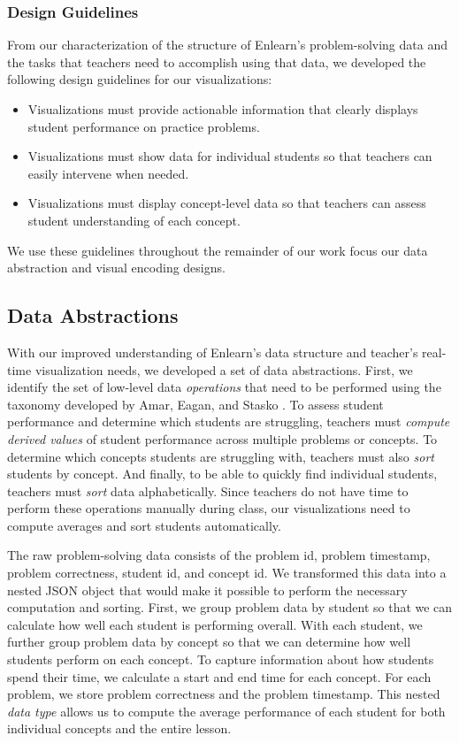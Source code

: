 \documentclass{sigchi}
\begin{document}
\subsubsection{Design Guidelines}
From our characterization of the structure of Enlearn's problem-solving data and the tasks that teachers need to accomplish using that data, we developed the following design guidelines for our visualizations:

\begin{itemize} \itemsep5pt \parskip0pt 
  \item Visualizations must provide actionable information that clearly displays student performance on practice problems.
  \item Visualizations must show data for individual students so that teachers can easily intervene when needed.
  \item Visualizations must display concept-level data so that teachers can assess student understanding of each concept.
\end{itemize}

We use these guidelines throughout the remainder of our work focus our data abstraction and visual encoding designs.



\subsection{Data Abstractions}
With our improved understanding of Enlearn's data structure and teacher's real-time visualization needs, we developed a set of data abstractions. First, we identify the set of low-level data \emph{operations} that need to be performed using the taxonomy developed by Amar, Eagan, and Stasko \cite{Amar05}. To assess student performance and determine which students are struggling, teachers must \emph{compute derived values} of student performance across multiple problems or concepts. To determine which concepts students are struggling with, teachers must also \emph{sort} students by concept. And finally, to be able to quickly find individual students, teachers must \emph{sort} data alphabetically. Since teachers do not have time to perform these operations manually during class, our visualizations need to compute averages and sort students automatically.

The raw problem-solving data consists of the problem id, problem timestamp, problem correctness, student id, and concept id. We transformed this data into a nested JSON object that would make it possible to perform the necessary computation and sorting. First, we group problem data by student so that we can calculate how well each student is performing overall. With each student, we further group problem data by concept so that we can determine how well students perform on each concept. To capture information about how students spend their time, we calculate a start and end time for each concept. For each problem, we store problem correctness and the problem timestamp. This nested \emph{data type} allows us to compute the average performance of each student for both individual concepts and the entire lesson.
\end{document}
